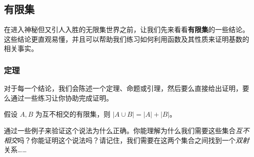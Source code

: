 
\subsection{有限集}

在进入神秘但又引人入胜的无限集世界之前，让我们先来看看\textbf{有限集}的一些结论。这些结论更直观易懂，并且可以帮助我们练习如何利用函数及其性质来证明基数的相关事实。

\subsubsection*{定理}

对于每一个结论，我们会陈述一个定理、命题或引理，然后要么直接给出证明，要么通过一些练习让你协助完成证明。

\begin{theorem}\label{theorem7.6.7}
    假设 $A,B$ 为互不相交的有限集，则 $|A \cup B| = |A| + |B|$。
\end{theorem}

通过一些例子来验证这个说法为什么正确。你能理解为什么我们需要这些集合\emph{互不相交}吗？你能证明这个说法吗？请记住，我们需要在这两个集合之间找到一个\emph{双射}关系……

